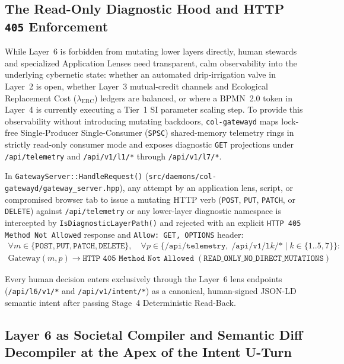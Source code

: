\subsection{The Read-Only Diagnostic Hood and HTTP \texttt{405} Enforcement}

While Layer~6 is forbidden from mutating lower layers directly, human stewards and specialized
Application Lenses need transparent, calm observability into the underlying cybernetic state:
whether an automated drip-irrigation valve in Layer~2 is open, whether Layer~3 mutual-credit
channels and Ecological Replacement Cost ($\lambda_{\mathrm{ERC}}$) ledgers are balanced, or where
a BPMN~2.0 token in Layer~4 is currently executing a Tier~1 SI parameter scaling step. To provide
this observability without introducing mutating backdoors, \texttt{col-gatewayd} maps lock-free
Single-Producer Single-Consumer (\texttt{SPSC}) shared-memory telemetry rings in strictly
read-only consumer mode and exposes diagnostic \texttt{GET} projections under
\texttt{/api/telemetry} and \texttt{/api/v1/l1/*} through \texttt{/api/v1/l7/*}.

In \texttt{GatewayServer::HandleRequest()} (\texttt{src/daemons/col-gatewayd/gateway\_server.hpp}),
any attempt by an application lens, script, or compromised browser tab to issue a mutating HTTP
verb (\texttt{POST}, \texttt{PUT}, \texttt{PATCH}, or \texttt{DELETE}) against
\texttt{/api/telemetry} or any lower-layer diagnostic namespace is intercepted by
\texttt{IsDiagnosticLayerPath()} and rejected with an explicit
\texttt{HTTP 405 Method Not Allowed} response and \texttt{Allow: GET, OPTIONS} header:
\begin{equation}
\begin{aligned}
\forall m \in \{\texttt{POST}, \texttt{PUT}, \texttt{PATCH}, \texttt{DELETE}\}, \quad
\forall p \in \{\texttt{/api/telemetry}, \; \texttt{/api/v1/l}k\texttt{/*} \mid k \in \{1..5, 7\}\}: \\
\mathrm{Gateway}(m, p) \longrightarrow \texttt{HTTP 405 Method Not Allowed}
\; (\texttt{READ\_ONLY\_NO\_DIRECT\_MUTATIONS})
\end{aligned}
\end{equation}

Every human decision enters exclusively through the Layer~6 lens endpoints
(\texttt{/api/l6/v1/*} and \texttt{/api/v1/intent/*}) as a canonical, human-signed JSON-LD
semantic intent after passing Stage~4 Deterministic Read-Back.

\subsection{Layer 6 as Societal Compiler and Semantic Diff Decompiler at the Apex of the Intent U-Turn}

